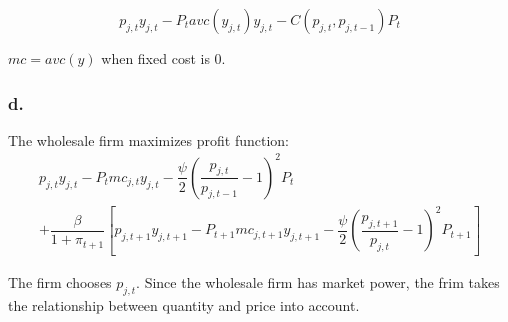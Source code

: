 \documentclass{article}
\begin{document}
\begin{equation*}
    p_{j,t}y_{j,t}-P_{t}avc\left(y_{j,t}\right)y_{j,t}-C\left(p_{j,t},p_{j,t-1}\right)P_{t}
\end{equation*}

$mc=avc\left(y\right)$ when fixed cost is 0.

\subsubsection*{d.}

The wholesale firm maximizes profit function:
\begin{multline*}
    p_{j,t}y_{j,t}-P_{t}mc_{j,t}y_{j,t}-\dfrac{\psi}{2}\left(\dfrac{p_{j,t}}{p_{j,t-1}}-1\right)^{2}P_{t}\\
    +\dfrac{\beta}{1+\pi_{t+1}}\left[p_{j,t+1}y_{j,t+1}-P_{t+1}mc_{j,t+1}y_{j,t+1}-\dfrac{\psi}{2}\left(\dfrac{p_{j,t+1}}{p_{j,t}}-1\right)^{2}P_{t+1}\right]
\end{multline*}

The firm chooses $p_{j,t}$. Since the wholesale firm has market power, the frim takes the relationship between quantity and price into account. 
\end{document}
